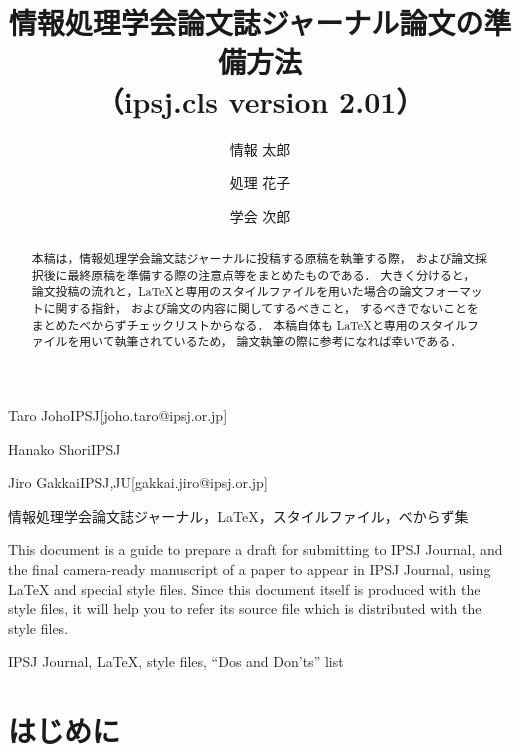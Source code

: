 \documentclass[submit]{ipsj-lualatex}
\begin{document}
\title{情報処理学会論文誌ジャーナル論文の準備方法\\
（ipsj.cls version 2.01）}





\author{情報 太郎}{Taro Joho}{IPSJ}[joho.taro@ipsj.or.jp]
\author{処理 花子}{Hanako Shori}{IPSJ}
\author{学会 次郎}{Jiro Gakkai}{IPSJ,JU}[gakkai.jiro@ipsj.or.jp]

\begin{abstract}
本稿は，情報処理学会論文誌ジャーナルに投稿する原稿を執筆する際，
および論文採択後に最終原稿を準備する際の注意点等をまとめたものである．
大きく分けると，
論文投稿の流れと，\LaTeX と専用のスタイルファイルを用いた場合の論文フォーマットに関する指針，
および論文の内容に関してするべきこと，
するべきでないことをまとめたべからずチェックリストからなる．
本稿自体も \LaTeX と専用のスタイルファイルを用いて執筆されているため，
論文執筆の際に参考になれば幸いである．
\end{abstract}


\begin{jkeyword}
情報処理学会論文誌ジャーナル，\LaTeX，スタイルファイル，べからず集
\end{jkeyword}

\begin{eabstract}
This document is a guide to prepare a draft for submitting to IPSJ
Journal, and the final camera-ready manuscript of a paper to appear in
IPSJ Journal, using {\LaTeX} and special style files.  Since this
document itself is produced with the style files, it will help you to
refer its source file which is distributed with the style files.
\end{eabstract}

\begin{ekeyword}
IPSJ Journal, \LaTeX, style files, ``Dos and Don'ts'' list
\end{ekeyword}

\maketitle

\section{はじめに}
\end{document}
